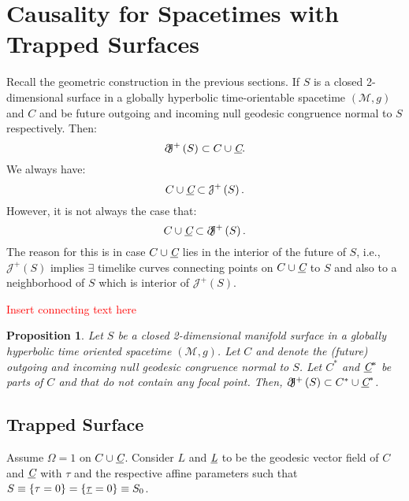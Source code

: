 \documentclass[12pt, a4paper]{report}
\theoremstyle{bfnote}
\newtheorem{proposition}{Proposition}[section]
\newcommand{\underit}[1]{\textit{\underbar{#1}}}
\begin{document}
\section{Causality for Spacetimes with Trapped Surfaces}
Recall the geometric construction in the previous sections. If $S$ is a closed
2-dimensional surface in a globally hyperbolic time-orientable spacetime
$\left(\mathcal{M}, g\right)$ and $C$ and \textit{} be future
outgoing and incoming null geodesic congruence normal to $S$ respectively. Then:
\begin{equation}
    \partial\hspace{-0.3em}\mathcal{J}^+\left(S\right) \subset C \cup \textit{\underbar{C}}.
\end{equation}
We always have:
\begin{equation}
    C \cup \textit{\underbar{C}} \subset \mathcal{J}^+\left(S\right).
\end{equation}
However, it is not always the case that:
\begin{equation}\label{eq:BCnotalwaystrue}
    C \cup \textit{\underbar{C}} \subset \partial\hspace{-0.3em}\mathcal{J}^+\left(S\right).
\end{equation}
The reason for this is in case $C \cup \textit{\underbar{C}}$ lies in the
interior of the future of $S$, i.e., $\mathcal{J}^+\left(S\right)$ implies
$\exists$ timelike curves connecting points on $C \cup \textit{\underbar{C}}$ to
$S$ and also to a neighborhood of $S$ which is interior of
$\mathcal{J}^+\left(S\right)$.

\textcolor{red}{Insert connecting text here}

\begin{proposition}
    Let $S$ be a closed 2-dimensional manifold surface in a globally hyperbolic
    time oriented spacetime $\left(\mathcal{M}, g\right)$. Let $C$ and
    \textit{} denote the (future) outgoing and incoming null
    geodesic congruence normal to $S$. Let $C^*$ and $\textit{\underbar{C}}^*$
    be parts of $C$ and \textit{} that do not contain any focal
    point. Then, $\partial\hspace{-0.3em}\mathcal{J}^+\left(S\right) \subset C^*
    \cup \textit{\underbar{C}}^*$.
\end{proposition}

\subsection{Trapped Surface}
Assume $\Omega = 1$ on $C \cup \textit{\underbar{C}}$. Consider $L$ and
$\underit{L}$ to be the geodesic vector field of $C$ and $\underit{C}$ with
$\tau$ and \underit{$\tau$} the respective affine parameters such that $S \equiv
\{\tau = 0\} = \{\underit{$\tau$} = 0\} \equiv S_0$.
\end{document}
